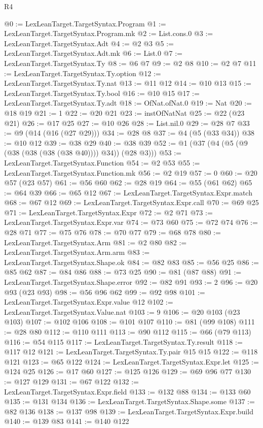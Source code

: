 \begin{lexlean}{R4}
\begin{coremodule}
{{{{{{{{{{{{{{{{{{{{{{{{{{{{{@0 := LexLeanTarget.TargetSyntax.Program
@1 := LexLeanTarget.TargetSyntax.Program.mk
@2 := List.cons.{0}
@3 := LexLeanTarget.TargetSyntax.Adt
@4 := @2 @3
@5 := LexLeanTarget.TargetSyntax.Adt.mk
@6 := List.{0}
@7 := LexLeanTarget.TargetSyntax.Ty
@8 := @6 @7
@9 := @2 @8
@10 := @2 @7
@11 := LexLeanTarget.TargetSyntax.Ty.option
@12 := LexLeanTarget.TargetSyntax.Ty.nat
@13 := @11 @12
@14 := @10 @13
@15 := LexLeanTarget.TargetSyntax.Ty.bool
@16 := @10 @15
@17 := LexLeanTarget.TargetSyntax.Ty.adt
@18 := OfNat.ofNat.{0}
@19 := Nat
@20 := @18 @19
@21 := 1
@22 := @20 @21
@23 := instOfNatNat
@25 := @22 (@23 @21)
@26 := @17 @25
@27 := @10 @26
@28 := List.nil.{0}
@29 := @28 @7
@33 := @9 (@14 (@16 (@27 @29)))
@34 := @28 @8
@37 := @4 (@5 (@33 @34))
@38 := @10 @12
@39 := @38 @29
@40 := @38 @39
@52 := @1 (@37 (@4 (@5 (@9 (@38 (@38 (@38 (@38 @40)))) @34)) (@28 @3)))
@53 := LexLeanTarget.TargetSyntax.Function
@54 := @2 @53
@55 := LexLeanTarget.TargetSyntax.Function.mk
@56 := @2 @19
@57 := 0
@60 := @20 @57 (@23 @57)
@61 := @56 @60
@62 := @28 @19
@64 := @55 (@61 @62)
@65 := @64 @39
@66 := @65 @12
@67 := LexLeanTarget.TargetSyntax.Expr.match
@68 := @67 @12
@69 := LexLeanTarget.TargetSyntax.Expr.call
@70 := @69 @25
@71 := LexLeanTarget.TargetSyntax.Expr
@72 := @2 @71
@73 := LexLeanTarget.TargetSyntax.Expr.var
@74 := @73 @60
@75 := @72 @74
@76 := @28 @71
@77 := @75 @76
@78 := @70 @77
@79 := @68 @78
@80 := LexLeanTarget.TargetSyntax.Arm
@81 := @2 @80
@82 := LexLeanTarget.TargetSyntax.Arm.arm
@83 := LexLeanTarget.TargetSyntax.Shape.ok
@84 := @82 @83
@85 := @56 @25
@86 := @85 @62
@87 := @84 @86
@88 := @73 @25
@90 := @81 (@87 @88)
@91 := LexLeanTarget.TargetSyntax.Shape.error
@92 := @82 @91
@93 := 2
@96 := @20 @93 (@23 @93)
@98 := @56 @96 @62
@99 := @92 @98
@101 := LexLeanTarget.TargetSyntax.Expr.value @12
@102 := LexLeanTarget.TargetSyntax.Value.nat
@103 := 9
@106 := @20 @103 (@23 @103)
@107 := @102 @106
@108 := @101 @107
@110 := @81 (@99 @108)
@111 := @28 @80
@112 := @110 @111
@113 := @90 @112
@115 := @66 (@79 @113)
@116 := @54 @115
@117 := LexLeanTarget.TargetSyntax.Ty.result
@118 := @117 @12
@121 := LexLeanTarget.TargetSyntax.Ty.pair @15 @15
@122 := @118 @121
@123 := @65 @122
@124 := LexLeanTarget.TargetSyntax.Expr.let
@125 := @124 @25
@126 := @17 @60
@127 := @125 @126
@129 := @69 @96 @77
@130 := @127 @129
@131 := @67 @122
@132 := LexLeanTarget.TargetSyntax.Expr.field
@133 := @132 @88
@134 := @133 @60
@135 := @131 @134
@136 := LexLeanTarget.TargetSyntax.Shape.some
@137 := @82 @136
@138 := @137 @98
@139 := LexLeanTarget.TargetSyntax.Expr.build
@140 := @139 @83
@141 := @140 @122
}}}}}}}}}}}}}}}}}}}}}}}}}}}}}
\end{coremodule}
\end{lexlean}
